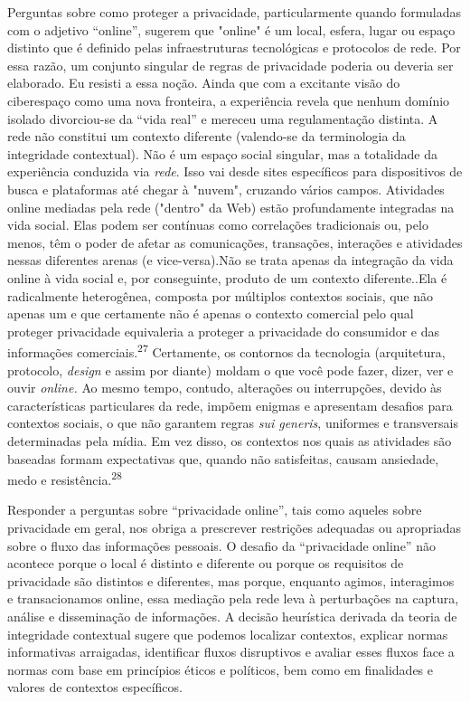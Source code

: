 Perguntas sobre como proteger a privacidade, particularmente quando
formuladas com o adjetivo ``online'', sugerem que "online" é um local,
esfera, lugar ou espaço distinto que é definido pelas infraestruturas
tecnológicas e protocolos de rede. Por essa razão, um conjunto singular
de regras de privacidade poderia ou deveria ser elaborado. Eu resisti a
essa noção. Ainda que com a excitante visão do ciberespaço como uma nova
fronteira, a experiência revela que nenhum domínio isolado divorciou-se
da ``vida real'' e mereceu uma regulamentação distinta. A rede não
constitui um contexto diferente (valendo-se da terminologia da
integridade contextual). Não é um espaço social singular, mas a
totalidade da experiência conduzida via \emph{rede}. Isso vai desde
sites específicos para dispositivos de busca e plataformas até chegar à
"nuvem", cruzando vários campos. Atividades online mediadas pela rede
("dentro" da Web) estão profundamente integradas na vida social. Elas
podem ser contínuas como correlações tradicionais ou, pelo menos, têm o
poder de afetar as comunicações, transações, interações e atividades
nessas diferentes arenas (e vice-versa).Não se trata apenas da
integração da vida online à vida social e, por conseguinte, produto de
um contexto diferente..Ela é radicalmente heterogênea, composta por
múltiplos contextos sociais, que não apenas um e que certamente não é
apenas o contexto comercial pelo qual proteger privacidade equivaleria a
proteger a privacidade do consumidor e das informações
comerciais.\textsuperscript{{27}} Certamente, os contornos da tecnologia
(arquitetura, protocolo, \emph{design} e assim por diante) moldam o que
você pode fazer, dizer, ver e ouvir \emph{online.} Ao mesmo tempo,
contudo, alterações ou interrupções, devido às características
particulares da rede, impõem enigmas e apresentam desafios para
contextos sociais, o que não garantem regras \emph{sui generis},
uniformes e transversais determinadas pela mídia. Em vez disso, os
contextos nos quais as atividades são baseadas formam expectativas que,
quando não satisfeitas, causam ansiedade, medo e
resistência.\textsuperscript{{28}}

Responder a perguntas sobre ``privacidade online'', tais como aqueles
sobre privacidade em geral, nos obriga a prescrever restrições adequadas
ou apropriadas sobre o fluxo das informações pessoais. O desafio da
``privacidade online'' não acontece porque o local é distinto e
diferente ou porque os requisitos de privacidade são distintos e
diferentes, mas porque, enquanto agimos, interagimos e transacionamos
online, essa mediação pela rede leva à perturbações na captura, análise
e disseminação de informações. A decisão heurística derivada da teoria
de integridade contextual sugere que podemos localizar contextos,
explicar normas informativas arraigadas, identificar fluxos disruptivos
e avaliar esses fluxos face a normas com base em princípios éticos e
políticos, bem como em finalidades e valores de contextos específicos.

